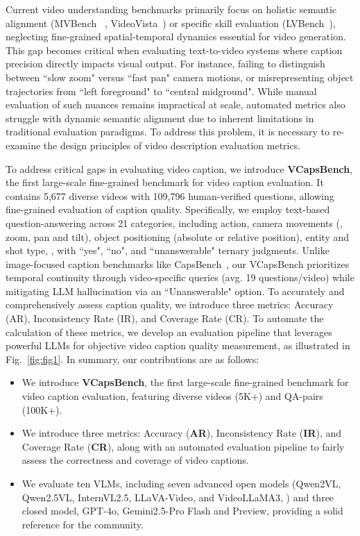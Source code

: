 Current video understanding benchmarks primarily focus on holistic semantic alignment (MVBench ~\cite{li2024mvbench}, VideoVista~\cite{li2024videovista}) or specific skill evaluation (LVBench~\cite{wang2024lvbench}), neglecting fine-grained spatial-temporal dynamics essential for video generation. This gap becomes critical when evaluating text-to-video systems where caption precision directly impacts visual output. For instance, failing to distinguish between ``slow zoom" versus ``fast pan" camera motions, or misrepresenting object trajectories from ``left foreground" to ``central midground". While manual evaluation of such nuances remains impractical at scale, automated metrics also struggle with dynamic semantic alignment due to inherent limitations in traditional evaluation paradigms. To address this problem, it is necessary to re-examine the design principles of video description evaluation metrics.

To address critical gaps in evaluating video caption,  we introduce \textbf{VCapsBench}, the first large-scale fine-grained benchmark for video caption evaluation. It contains 5,677 diverse videos with 109,796 human-verified questions, allowing fine-grained evaluation of caption quality. Specifically, we employ text-based question-answering across 21 categories, including action, camera movements (\eg, zoom, pan and tilt), object positioning (absolute or relative position), entity and shot type, \etc, with ``yes", ``no", and ``unanswerable" ternary judgments. Unlike image-focused caption benchmarks like CapsBench~\cite{playgroundv3}, our VCapsBench prioritizes temporal continuity through video-specific queries (avg. 19 questions/video) while mitigating LLM hallucination via an ``Unanswerable" option. To accurately and comprehensively assess caption quality, we introduce three metrics: Accuracy (AR), Inconsistency Rate (IR), and Coverage Rate (CR). To automate the calculation of these metrics, we develop an evaluation pipeline that leverages powerful LLMs for objective video caption quality measurement, as illustrated in Fig.~\ref{fig:fig1}. In summary, our contributions are as follows:
\begin{itemize}
    \item We introduce \textbf{VCapsBench}, the first large-scale fine-grained benchmark for video caption evaluation, featuring diverse videos (5K+) and QA-pairs (100K+).
    \item We introduce three metrics: Accuracy (\textbf{AR}), Inconsistency Rate (\textbf{IR}), and Coverage Rate (\textbf{CR}), along with an automated evaluation pipeline to fairly assess the correctness and coverage of video captions.
    
    \item We evaluate ten VLMs, including seven advanced open models (Qwen2VL, Qwen2.5VL, InternVL2.5, LLaVA-Video, and VideoLLaMA3, \etc) and three closed model, GPT-4o,  Gemini2.5-Pro Flash and Preview, providing a solid reference for the community.
\end{itemize}





